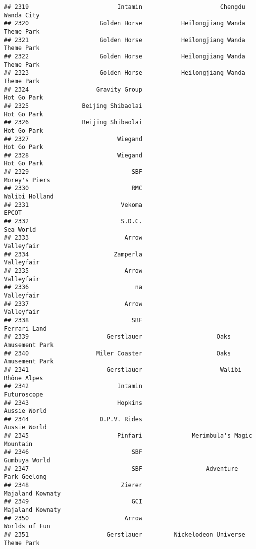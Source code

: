 \documentclass[
]{article}
\begin{document}
\begin{verbatim}
## 2319                         Intamin                      Chengdu Wanda City
## 2320                    Golden Horse           Heilongjiang Wanda Theme Park
## 2321                    Golden Horse           Heilongjiang Wanda Theme Park
## 2322                    Golden Horse           Heilongjiang Wanda Theme Park
## 2323                    Golden Horse           Heilongjiang Wanda Theme Park
## 2324                   Gravity Group                             Hot Go Park
## 2325               Beijing Shibaolai                             Hot Go Park
## 2326               Beijing Shibaolai                             Hot Go Park
## 2327                         Wiegand                             Hot Go Park
## 2328                         Wiegand                             Hot Go Park
## 2329                             SBF                           Morey's Piers
## 2330                             RMC                          Walibi Holland
## 2331                          Vekoma                                   EPCOT
## 2332                          S.D.C.                               Sea World
## 2333                           Arrow                              Valleyfair
## 2334                        Zamperla                              Valleyfair
## 2335                           Arrow                              Valleyfair
## 2336                              na                              Valleyfair
## 2337                           Arrow                              Valleyfair
## 2338                             SBF                            Ferrari Land
## 2339                      Gerstlauer                     Oaks Amusement Park
## 2340                   Miler Coaster                     Oaks Amusement Park
## 2341                      Gerstlauer                      Walibi Rhône Alpes
## 2342                         Intamin                             Futuroscope
## 2343                         Hopkins                            Aussie World
## 2344                    D.P.V. Rides                            Aussie World
## 2345                         Pinfari              Merimbula's Magic Mountain
## 2346                             SBF                           Gumbuya World
## 2347                             SBF                  Adventure Park Geelong
## 2348                          Zierer                        Majaland Kownaty
## 2349                             GCI                        Majaland Kownaty
## 2350                           Arrow                           Worlds of Fun
## 2351                      Gerstlauer         Nickelodeon Universe Theme Park

\end{verbatim}
\end{document}
